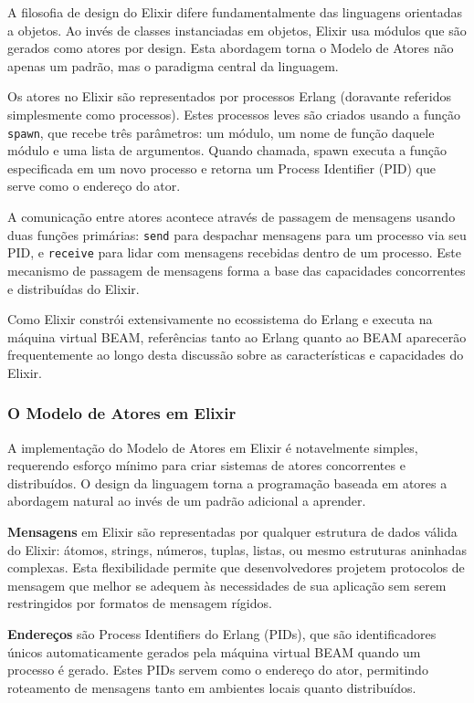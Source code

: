 A filosofia de design do Elixir difere fundamentalmente das linguagens orientadas a objetos. Ao invés de classes instanciadas em objetos, Elixir usa módulos que são gerados como atores por design. Esta abordagem torna o Modelo de Atores não apenas um padrão, mas o paradigma central da linguagem.

Os atores no Elixir são representados por processos Erlang (doravante referidos simplesmente como processos). Estes processos leves são criados usando a função \texttt{spawn}, que recebe três parâmetros: um módulo, um nome de função daquele módulo e uma lista de argumentos. Quando chamada, spawn executa a função especificada em um novo processo e retorna um Process Identifier (PID) que serve como o endereço do ator.

A comunicação entre atores acontece através de passagem de mensagens usando duas funções primárias: \texttt{send} para despachar mensagens para um processo via seu PID, e \texttt{receive} para lidar com mensagens recebidas dentro de um processo. Este mecanismo de passagem de mensagens forma a base das capacidades concorrentes e distribuídas do Elixir.

Como Elixir constrói extensivamente no ecossistema do Erlang e executa na máquina virtual BEAM, referências tanto ao Erlang quanto ao BEAM aparecerão frequentemente ao longo desta discussão sobre as características e capacidades do Elixir.

\subsubsection{O Modelo de Atores em Elixir}

A implementação do Modelo de Atores em Elixir é notavelmente simples, requerendo esforço mínimo para criar sistemas de atores concorrentes e distribuídos. O design da linguagem torna a programação baseada em atores a abordagem natural ao invés de um padrão adicional a aprender.

\textbf{Mensagens} em Elixir são representadas por qualquer estrutura de dados válida do Elixir: átomos, strings, números, tuplas, listas, ou mesmo estruturas aninhadas complexas. Esta flexibilidade permite que desenvolvedores projetem protocolos de mensagem que melhor se adequem às necessidades de sua aplicação sem serem restringidos por formatos de mensagem rígidos.

\textbf{Endereços} são Process Identifiers do Erlang (PIDs), que são identificadores únicos automaticamente gerados pela máquina virtual BEAM quando um processo é gerado. Estes PIDs servem como o endereço do ator, permitindo roteamento de mensagens tanto em ambientes locais quanto distribuídos.

